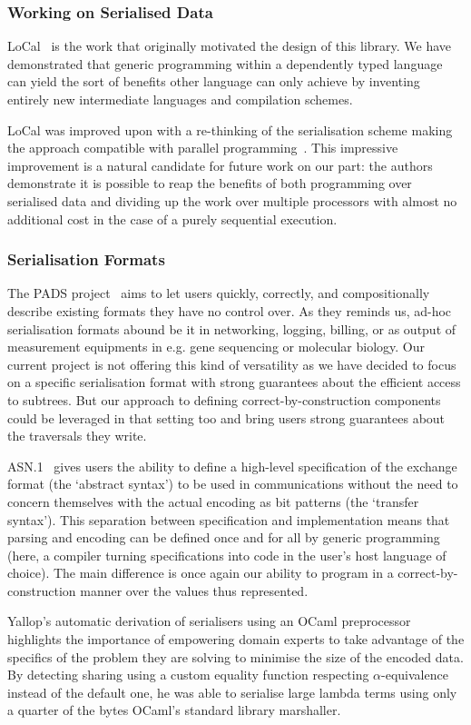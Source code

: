 \subsubsection{Working on Serialised Data}

LoCal~\cite{DBLP:conf/pldi/VollmerKRS0N19} is the work that originally
motivated the design of this library.
%
We have demonstrated that generic programming within a dependently typed
language can yield the sort of benefits other language can only achieve
by inventing entirely new intermediate languages and compilation schemes.

LoCal was improved upon with a re-thinking of the serialisation scheme
making the approach compatible with parallel
programming~\cite{DBLP:journals/pacmpl/KoparkarRVKN21}.
This impressive improvement is a natural candidate for future work on our
part: the authors demonstrate it is possible to reap the benefits of
both programming over serialised data
and dividing up the work over multiple processors
with almost no additional cost in the case of a purely sequential execution.

\subsubsection{Serialisation Formats}

The PADS project~\cite{DBLP:conf/popl/MandelbaumFWFG07} aims to let users
quickly, correctly, and compositionally describe existing formats they
have no control over.
%
As they reminds us, ad-hoc serialisation formats abound be it in
networking, logging, billing, or as output of measurement equipments
in e.g. gene sequencing or molecular biology.
%
Our current project is not offering this kind of versatility as we have
decided to focus on a specific serialisation format with strong
guarantees about the efficient access to subtrees.
%
But our approach to defining correct-by-construction components could
be leveraged in that setting too and bring users strong guarantees about
the traversals they write.

ASN.1~\cite{MANUAL:book/larmouth1999} gives users the ability to define
a high-level specification of the exchange format (the `abstract syntax')
to be used in communications without the need to concern themselves with
the actual encoding as bit patterns (the `transfer syntax').
%
This separation between specification and implementation means that parsing
and encoding can be defined once and for all by generic programming
(here, a compiler turning specifications into code in the user's host
language of choice).
%
The main difference is once again our ability to program in a
correct-by-construction manner over the values thus represented.


Yallop's automatic derivation of serialisers using an OCaml
preprocessor~\cite{DBLP:conf/ml/Yallop07} highlights the importance
of empowering domain experts to take advantage of the specifics of
the problem they are solving to minimise the size of the encoded data.
%
By detecting sharing using a custom equality function respecting
$\alpha$-equivalence instead of the default one, he was able to
serialise large lambda terms using only
a quarter of the bytes OCaml's standard library marshaller.
